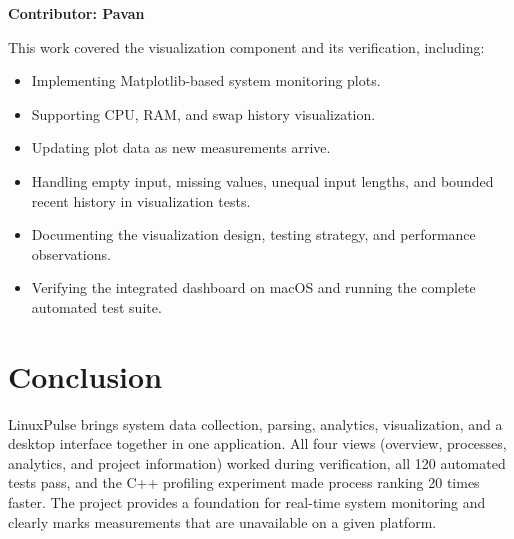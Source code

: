 \documentclass[11pt,a4paper]{article}
\begin{document}
\textbf{Contributor: Pavan}

This work covered the visualization component and its verification, including:
\begin{itemize}
    \item Implementing Matplotlib-based system monitoring plots.
    \item Supporting CPU, RAM, and swap history visualization.
    \item Updating plot data as new measurements arrive.
    \item Handling empty input, missing values, unequal input lengths, and
          bounded recent history in visualization tests.
    \item Documenting the visualization design, testing strategy, and
          performance observations.
    \item Verifying the integrated dashboard on macOS and running the complete
          automated test suite.
\end{itemize}

\section{Conclusion}

LinuxPulse brings system data collection, parsing, analytics, visualization, and
a desktop interface together in one application. All four views (overview,
processes, analytics, and project information) worked during verification, all
120 automated tests pass, and the C++ profiling experiment made process ranking
20 times faster. The project provides a foundation for real-time system
monitoring and clearly marks measurements that are unavailable on a given
platform.
\end{document}
